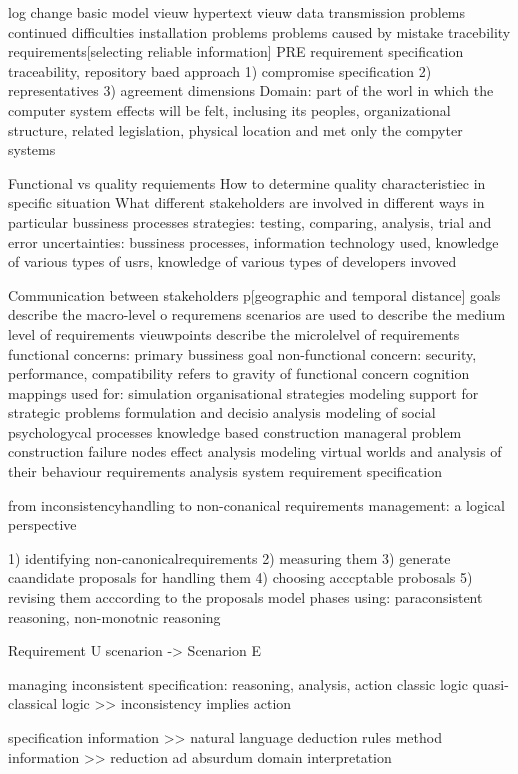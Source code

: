 log change
basic model vieuw
hypertext vieuw
data transmission problems
continued difficulties
installation problems
problems caused by mistake
tracebility requirements[selecting reliable information]
PRE requirement specification traceability, repository baed approach
1) compromise specification
2) representatives
3) agreement dimensions
Domain: part of the worl in which the computer system effects will be felt, inclusing its peoples, organizational structure, related legislation, physical location and met only the compyter systems

Functional vs quality requiements
How to determine quality characteristiec in specific situation
What different stakeholders are involved in different ways in particular bussiness processes
strategies: testing, comparing, analysis, trial and error
uncertainties: bussiness processes, information technology used, knowledge of various types of usrs, knowledge of various types of developers invoved

Communication between stakeholders p[geographic and temporal distance]
goals describe the macro-level o requremens
scenarios are used to describe the medium level of requirements vieuwpoints describe the microlelvel of requirements
functional concerns:  primary bussiness goal
non-functional concern: security, performance, compatibility refers to gravity of functional concern
cognition mappings used for:
simulation
organisational strategies modeling
support for strategic problems
formulation and decisio analysis
modeling of social psychologycal processes
knowledge based construction
manageral problem construction
failure nodes effect analysis
modeling virtual worlds and analysis of their behaviour
requirements analysis
system requirement  specification


from inconsistencyhandling to non-conanical requirements management: a logical perspective

1) identifying non-canonicalrequirements
2) measuring them
3) generate caandidate proposals for handling them
4) choosing acccptable probosals
5) revising them acccording to the proposals
model phases using: paraconsistent reasoning, non-monotnic reasoning

Requirement U scenarion -> Scenarion E



managing inconsistent specification: reasoning, analysis, action
classic logic
quasi-classical logic >> inconsistency implies action

specification information >> natural language deduction rules
method information >> reduction ad absurdum
domain interpretation


